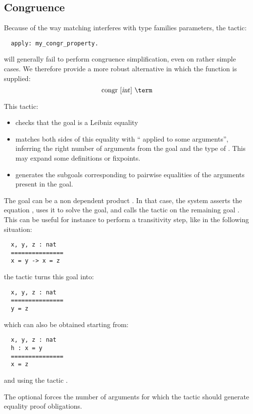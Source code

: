 \subsection{Congruence}\label{ssec:congr}

Because of the way matching interferes with type families parameters,
the tactic:
\begin{lstlisting}
  apply: my_congr_property.
\end{lstlisting}
will generally fail to perform congruence simplification, even on
rather simple cases. We therefore provide a
more robust alternative in which the function is supplied:
$$\ssrC{congr}\ [\ssrN{int}]\ {\term}$$

This tactic:
\begin{itemize}
\item checks that the goal is a Leibniz equality
\item matches both sides of this equality with ``{\term} applied to
  some arguments'', inferring the right number of arguments from the goal
  and the type of {\term}. This may
  expand some definitions or fixpoints.
\item generates the subgoals corresponding to pairwise equalities of
  the arguments present in the goal.
\end{itemize}

The goal can be a non dependent product .
In that case, the system asserts the equation , uses it to solve
the goal, and calls the  tactic on the remaining goal
. This can be useful for instance to perform a transitivity
step, like in the following situation:
\begin{lstlisting}
  x, y, z : nat
  ===============
  x = y -> x = z
\end{lstlisting}
the tactic  turns this goal into:

\begin{lstlisting}
  x, y, z : nat
  ===============
  y = z
\end{lstlisting}
which can also be obtained starting from:
\begin{lstlisting}
  x, y, z : nat
  h : x = y
  ===============
  x = z
\end{lstlisting}
and using the tactic .

The optional  forces the number of arguments for which the
tactic should generate equality proof obligations.

